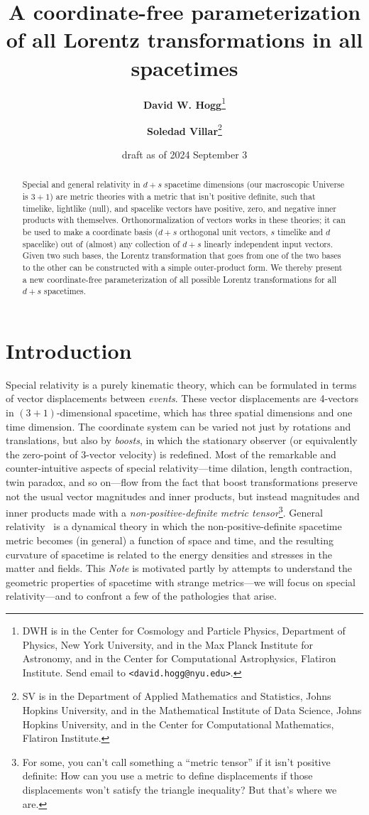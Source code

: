 \documentclass{article}
\title{\bfseries A coordinate-free parameterization of all Lorentz transformations in all spacetimes}
\author{\textbf{David W. Hogg}\footnote{DWH is in the Center for Cosmology and Particle Physics, Department of Physics, New York University, and in the Max Planck Institute for Astronomy, and in the Center for Computational Astrophysics, Flatiron Institute. Send email to \texttt{<david.hogg@nyu.edu>}.}
        \and
        \textbf{Soledad Villar}\footnote{SV is in the Department of Applied Mathematics and Statistics, Johns Hopkins University, and in the Mathematical Institute of Data Science, Johns Hopkins University, and in the Center for Computational Mathematics, Flatiron Institute.}}
\date{draft as of 2024 September 3}
\newcommand{\plus}{\!+\!} %
\newcommand{\documentname}{\textsl{Note}}
\begin{document}
\thispagestyle{plain}
\maketitle

\begin{abstract}\noindent %
    Special and general relativity in $d+s$ spacetime dimensions (our macroscopic Universe is $3+1$) are metric theories with a metric that isn't positive definite, such that timelike, lightlike (null), and spacelike vectors have positive, zero, and negative inner products with themselves.
    Orthonormalization of vectors works in these theories; it can be used to make a coordinate basis ($d+s$ orthogonal unit vectors, $s$ timelike and $d$ spacelike) out of (almost) any collection of $d+s$ linearly independent input vectors.
    Given two such bases, the Lorentz transformation that goes from one of the two bases to the other can be constructed with a simple outer-product form.
    We thereby present a new coordinate-free parameterization of all possible Lorentz transformations for all $d+s$ spacetimes.
\end{abstract}

\section{Introduction}\label{sec:intro}

Special relativity \cite{sr} is a purely kinematic theory, which can be formulated in terms of vector displacements between \emph{events}.
These vector displacements are 4-vectors in $(3\plus1)$-dimensional spacetime, which has three spatial dimensions and one time dimension.
The coordinate system can be varied not just by rotations and translations, but also by \emph{boosts}, in which the stationary observer (or equivalently the zero-point of 3-vector velocity) is redefined.
Most of the remarkable and counter-intuitive aspects of special relativity---time dilation, length contraction, twin paradox, and so on---flow from the fact that boost transformations preserve not the usual vector magnitudes and inner products, but instead magnitudes and inner products made with a \emph{non-positive-definite metric tensor}\footnote{For some, you can't call something a ``metric tensor'' if it isn't positive definite: How can you use a metric to define displacements if those displacements won't satisfy the triangle inequality? But that's where we are.}.
General relativity~\cite{gr} is a dynamical theory in which the non-positive-definite spacetime metric becomes (in general) a function of space and time, and the resulting curvature of spacetime is related to the energy densities and stresses in the matter and fields.
This \documentname{} is motivated partly by attempts to understand the geometric properties of spacetime with strange metrics---we will focus on special relativity---and to confront a few of the pathologies that arise.
\end{document}
